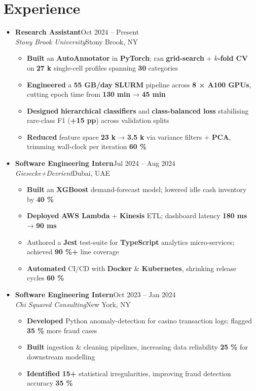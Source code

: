 \documentclass[letterpaper,10pt]{article}
\newcommand{\experienceEntry}[4]{%
  \textbf{#1}\hfill#2\\
  \textit{#3}\hfill#4\\
}
\begin{document}
\section{Experience}
\begin{itemize}[leftmargin=*,itemsep=-2pt,topsep=1pt]

\item
\experienceEntry
  {Research Assistant}
  {Oct 2024 – Present}
  {Stony Brook University}
  {Stony Brook, NY}
\begin{itemize}[leftmargin=*,itemsep=-2pt,topsep=-10pt]
  \item \textbf{Built} an \textbf{AutoAnnotator} in \textbf{PyTorch}; ran \textbf{grid-search} + \textbf{$k$-fold CV} on \textbf{27 k} single-cell profiles spanning \textbf{30} categories
  \item \textbf{Engineered} a \textbf{55 GB/day} \textbf{SLURM} pipeline across \textbf{8 × A100 GPUs}, cutting epoch time from \textbf{130 min} → \textbf{45 min}
  \item \textbf{Designed} \textbf{hierarchical classifiers} and \textbf{class-balanced loss} stabilising rare-class F1 (\textbf{+15 pp}) across validation splits
  \item \textbf{Reduced} feature space \textbf{23 k} → \textbf{3.5 k} via variance filters + \textbf{PCA}, trimming wall-clock per iteration \textbf{60 \%}
\end{itemize}

\item
\experienceEntry
  {Software Engineering Intern}
  {Jul 2024 – Aug 2024}
  {Giesecke+Devrient}
  {Dubai, UAE}
\begin{itemize}[leftmargin=*,itemsep=-2pt,topsep=-10pt]
  \item \textbf{Built} an \textbf{XGBoost} demand-forecast model; lowered idle cash inventory by \textbf{40 \%}
  \item \textbf{Deployed} \textbf{AWS Lambda} + \textbf{Kinesis} ETL; dashboard latency \textbf{180 ms} → \textbf{90 ms}
  \item Authored a \textbf{Jest} test-suite for \textbf{TypeScript} analytics micro-services; achieved \textbf{90 \%+} line coverage
  \item \textbf{Automated} CI/CD with \textbf{Docker} \& \textbf{Kubernetes}, shrinking release cycles \textbf{60 \%}
\end{itemize}

\item
\experienceEntry
  {Software Engineering Intern}
  {Oct 2023 – Jan 2024}
  {Chi Squared Consulting}
  {New York, NY}
\begin{itemize}[leftmargin=*,itemsep=-2pt,topsep=-10pt]
  \item \textbf{Developed} Python anomaly-detection for casino transaction logs; flagged \textbf{35 \%} more fraud cases
  \item \textbf{Built} ingestion \& cleaning pipelines, increasing data reliability \textbf{25 \%} for downstream modelling
  \item \textbf{Identified} \textbf{15+} statistical irregularities, improving fraud detection accuracy \textbf{35 \%}
\end{itemize}


\end{itemize}
\end{document}
